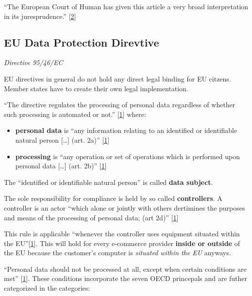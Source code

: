 ``The European Court of Human has given this article a very broad
interpretation in its juresprudence.'' {[}\hyperref[references]{2}{]}

\subsection{EU Data Protection Direvtive}

\emph{Directive 95/46/EC}

EU directives in general do not hold any direct legal binding for EU citzens.
Member states have to create their own legal implementation.

``The directive regulates the processing of personal data regardless of whether such processing is automated or not.''
{[}\hyperref[references]{1}{]} where:

\begin{itemize}
\item
  \textbf{personal data} is ``any information relating to an identified or identifiable natural person {[}\ldots{}{]} (art. 2a)''
  {[}\hyperref[references]{1}{]}
\item
  \textbf{processing} is ``any operation or set of operations which is performed upon personal data {[}\ldots{}{]} (art. 2b)''
  {[}\hyperref[references]{1}{]}
\end{itemize}

The ``identified or identifiable natural person'' is called \textbf{data subject}.

The sole responsibility for compliance is held by so called \textbf{controllers}.
A controller is an actor ``which alone or jointly with others dertimines the purposes and means of the processing of personal data; (art 2d)''
{[}\hyperref[references]{1}{]}

This rule is applicable ``whenever the controller uses equipment situated within the EU''{[}\hyperref[references]{1}{]}.
This will hold for every e-commerce provider \textbf{inside or outside} of the EU because the customer's computer is \emph{situated within the EU} anyways.

``Personal data should not be processed at all, except when certain conditions are met'' {[}\hyperref[references]{1}{]}.
These conditions incorporate the seven OECD princepals and are futher categorized in the categories:

